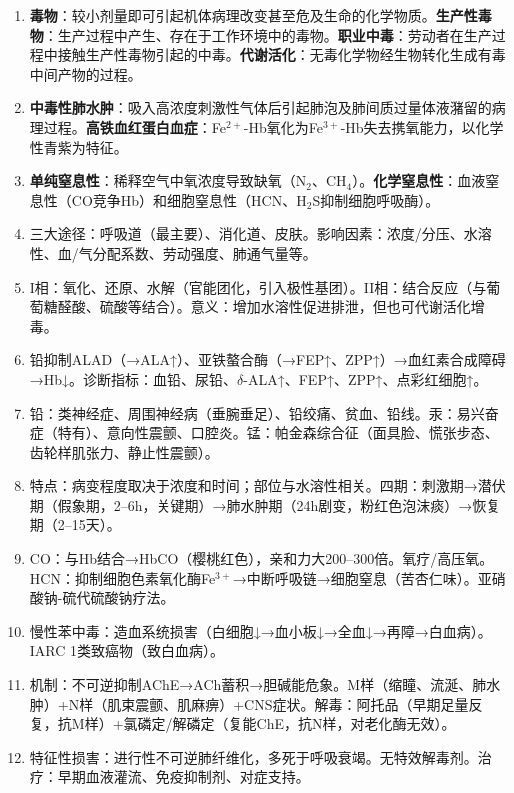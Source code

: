 \begin{enumerate}[leftmargin=*, itemsep=5pt]
    \item \textbf{毒物}：较小剂量即可引起机体病理改变甚至危及生命的化学物质。\textbf{生产性毒物}：生产过程中产生、存在于工作环境中的毒物。\textbf{职业中毒}：劳动者在生产过程中接触生产性毒物引起的中毒。\textbf{代谢活化}：无毒化学物经生物转化生成有毒中间产物的过程。
    \item \textbf{中毒性肺水肿}：吸入高浓度刺激性气体后引起肺泡及肺间质过量体液潴留的病理过程。\textbf{高铁血红蛋白血症}：Fe$^{2+}$-Hb氧化为Fe$^{3+}$-Hb失去携氧能力，以化学性青紫为特征。
    \item \textbf{单纯窒息性}：稀释空气中氧浓度导致缺氧（N$_2$、CH$_4$）。\textbf{化学窒息性}：血液窒息性（CO竞争Hb）和细胞窒息性（HCN、H$_2$S抑制细胞呼吸酶）。
    \item 三大途径：呼吸道（最主要）、消化道、皮肤。影响因素：浓度/分压、水溶性、血/气分配系数、劳动强度、肺通气量等。
    \item I相：氧化、还原、水解（官能团化，引入极性基团）。II相：结合反应（与葡萄糖醛酸、硫酸等结合）。意义：增加水溶性促进排泄，但也可代谢活化增毒。
    \item 铅抑制ALAD（→ALA↑）、亚铁螯合酶（→FEP↑、ZPP↑）→血红素合成障碍→Hb↓。诊断指标：血铅、尿铅、$\delta$-ALA↑、FEP↑、ZPP↑、点彩红细胞↑。
    \item 铅：类神经症、周围神经病（垂腕垂足）、铅绞痛、贫血、铅线。汞：易兴奋症（特有）、意向性震颤、口腔炎。锰：帕金森综合征（面具脸、慌张步态、齿轮样肌张力、静止性震颤）。
    \item 特点：病变程度取决于浓度和时间；部位与水溶性相关。四期：刺激期→潜伏期（假象期，2--6h，关键期）→肺水肿期（24h剧变，粉红色泡沫痰）→恢复期（2--15天）。
    \item CO：与Hb结合→HbCO（樱桃红色），亲和力大200--300倍。氧疗/高压氧。HCN：抑制细胞色素氧化酶Fe$^{3+}$→中断呼吸链→细胞窒息（苦杏仁味）。亚硝酸钠-硫代硫酸钠疗法。
    \item 慢性苯中毒：造血系统损害（白细胞↓→血小板↓→全血↓→再障→白血病）。IARC 1类致癌物（致白血病）。
    \item 机制：不可逆抑制AChE→ACh蓄积→胆碱能危象。M样（缩瞳、流涎、肺水肿）+N样（肌束震颤、肌麻痹）+CNS症状。解毒：阿托品（早期足量反复，抗M样）+氯磷定/解磷定（复能ChE，抗N样，对老化酶无效）。
    \item 特征性损害：进行性不可逆肺纤维化，多死于呼吸衰竭。无特效解毒剂。治疗：早期血液灌流、免疫抑制剂、对症支持。
\end{enumerate}

\newpage
\newpage